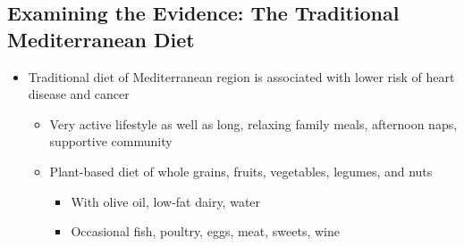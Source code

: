 \documentclass[12pt]{article}
\begin{document}
        \subsection{Examining the Evidence: The Traditional Mediterranean Diet}
            \begin{itemize}
                \item Traditional diet of Mediterranean region is associated with lower risk of heart disease and cancer
                    \begin{itemize}
                        \item Very active lifestyle as well as long, relaxing family meals, afternoon naps, supportive community
                        \item Plant-based diet of whole grains, fruits, vegetables, legumes, and nuts
                            \begin{itemize}
                                \item With olive oil, low-fat dairy, water
                                \item Occasional fish, poultry, eggs, meat, sweets, wine
                            \end{itemize}
                    \end{itemize}
            \end{itemize}
\end{document}
